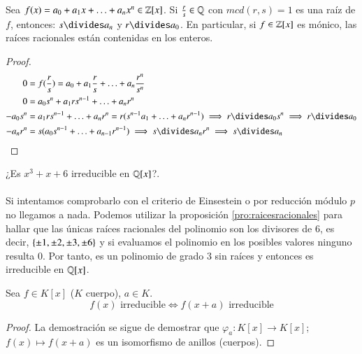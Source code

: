 \begin{pro}\label{pro:raicesracionales}
    Sea $f(x) = a_0 + a_1 x + \ldots + a_n x^n \in \mathbb{Z}[x]$. Si $\frac{r}{s} \in \mathbb{Q}$ con $mcd(r, s)=1$ es una raíz de $f$, entonces: $s \divides a_n$ y $r \divides a_0$. En particular, si $f \in \mathbb{Z}[x]$ es mónico, las raíces racionales están contenidas en los enteros.
\end{pro}
\begin{proof}
    \begin{align*}
        0 &= f(\frac{r}{s}) = a_0 + a_1 \frac{r}{s} + \ldots + a_n \frac{r^n}{s^n}\\
        0 &= a_0 s^n + a_1 r s^{n-1} + \ldots + a_n r^n \\
        -a_0 s^n &= a_1 r s^{n-1} + \ldots + a_n r^n = r (s^{n-1} a_1 + \ldots + a_n r^{n-1}) \implies r \divides a_0 s^n \implies r \divides a_0\\
        -a_n r^n &= s (a_0 s^{n-1} + \ldots + a_{n-1}r^{n-1}) \implies s \divides a_n r^n \implies s \divides a_n
    \end{align*}
\end{proof}

\begin{eg}
    ¿Es $x^3 + x + 6$ irreducible en $\mathbb{Q}[x]$?.\\\\
    Si intentamos comprobarlo con el criterio de Einsestein o por reducción módulo $p$ no llegamos a nada. Podemos utilizar la proposición \ref{pro:raicesracionales} para hallar que las únicas raíces racionales del polinomio son los divisores de $6$, es decir, $\left\{\pm 1, \pm 2, \pm 3, \pm 6\right\}$ y si evaluamos el polinomio en los posibles valores ninguno resulta $0$. Por tanto, es un polinomio de grado $3$ sin raíces y entonces es irreducible en $\mathbb{Q}[x]$.
\end{eg}

\begin{lm}\label{lema:irreducibilidadeval}
    Sea $f \in K[x]$ ($K$ cuerpo), $a \in K$.
    $$
        f(x) \text{ irreducible} \iff f(x+a) \text{ irreducible}
    $$
\end{lm}
\begin{proof}
    La demostración se sigue de demostrar que $\varphi_a: K[x] \to K[x]$; $f(x) \mapsto f(x+a)$ es un isomorfismo de anillos (cuerpos).
\end{proof}

